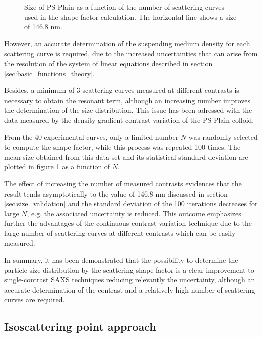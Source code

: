 \begin{figure}
	\begin{center}
		
	\end{center}
\caption{Size of PS-Plain as a function of the number of scattering curves used in the shape factor calculation. The horizontal line shows a size of 146.8 nm.}
\label{fig:ResonantTermSimulationNumber}
\end{figure}

However, an accurate determination of the suspending medium density for each scattering curve is required, due to the increased uncertainties\citep{lefebvre_propagation_2000} that can arise from the resolution of the system of linear equations described in section \ref{sec:basic_functions_theory}.

Besides, a minimum of 3 scattering curves measured at different contrasts is necessary to obtain the resonant term, although an increasing number improves the determination of the size distribution. This issue has been adressed with the data measured by the density gradient contrast variation of the PS-Plain colloid. 

From the 40 experimental curves, only a limited number $N$ was randomly selected to compute the shape factor, while this process was repeated 100 times. The mean size obtained from this data set and its statistical standard deviation are plotted in figure \ref{fig:ResonantTermSimulationNumber} as a function of $N$.

The effect of increasing the number of measured contrasts evidences that the result tends asymptotically to the value of 146.8 nm discussed in section \ref{sec:size_validation} and the standard deviation of the 100 iterations decreases for large $N$, e.g. the associated uncertainty is reduced. This outcome emphasizes further the advantages of the continuous contrast variation technique due to the large number of scattering curves at different contrasts which can be easily measured.

In summary, it has been demonstrated that the possibility to determine the particle size distribution by the scattering shape factor is a clear improvement to single-contrast SAXS techniques reducing relevantly the uncertainty, although an accurate determination of the contrast and a relatively high number of scattering curves are required. 

\subsection{Isoscattering point approach}

